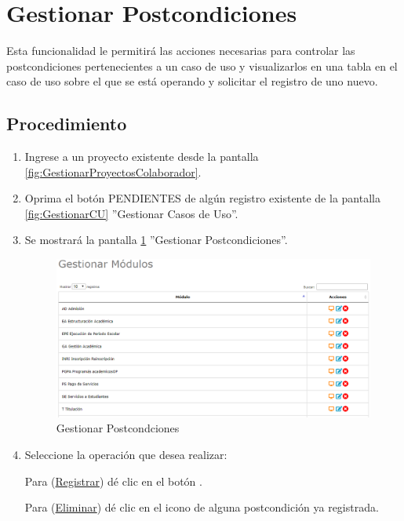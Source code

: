 \hypertarget{cv:GestionarPostcondiciones}{\section{Gestionar Postcondiciones}} \label{sec:GestionarPostcondiciones}

	Esta funcionalidad le permitirá las acciones necesarias para controlar las postcondiciones pertenecientes a un caso de uso y visualizarlos en una tabla en el caso de uso sobre el que se está operando y solicitar el registro de uno nuevo.

		\subsection{Procedimiento}

			\begin{enumerate}
				
			\item Ingrese a un proyecto existente desde la pantalla \ref{fig:GestionarProyectosColaborador}.
			
			\item Oprima el botón PENDIENTES de algún registro existente de la pantalla \ref{fig:GestionarCU} ''Gestionar Casos de Uso''.
	
			\item Se mostrará la pantalla \ref{fig:GestionarPostcondiciones} ''Gestionar Postcondiciones''.

			\begin{figure}[htbp!]
				\begin{center}
					\includegraphics[scale=0.6]{roles/lider/casosUso/pantallas/IU5gestionarModulos}
					\caption{Gestionar Postcondciones}
					\label{fig:GestionarPostcondiciones}
				\end{center}
			\end{figure}
		
				\item Seleccione la operación que desea realizar:
			
			Para (\hyperlink{cv:registrarPostcondicion}{Registrar}) dé clic en el botón \IURegistrar.
			
			Para (\hyperlink{cv:eliminarPostcondicion}{Eliminar}) dé clic en el icono \IUBotonEliminar{} de alguna postcondición ya registrada.
			
			\end{enumerate}